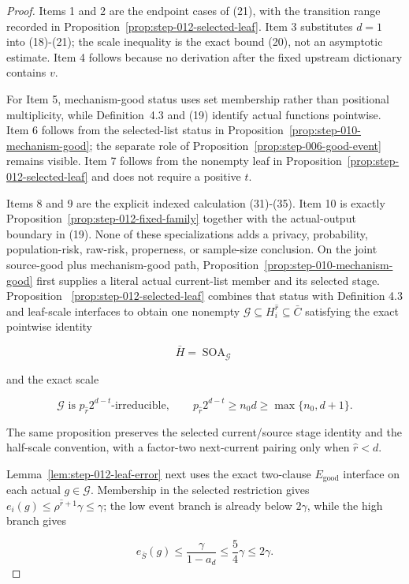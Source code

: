 \begin{proof}
Items 1 and 2 are the endpoint cases of (21), with the
transition range recorded in
Proposition~\ref{prop:step-012-selected-leaf}. Item 3 substitutes \(d=1\)
into (18)-(21); the scale inequality is the  exact bound (20), not
an asymptotic estimate. Item 4 follows because no derivation after the
fixed upstream dictionary contains \(v\).

For Item 5, mechanism-good status uses set membership rather than positional
multiplicity, while Definition~4.3 and (19) identify actual functions
pointwise. Item 6 follows from the selected-list status in
Proposition~\ref{prop:step-010-mechanism-good}; the separate role of
Proposition~\ref{prop:step-006-good-event} remains visible. Item 7 follows
from the nonempty leaf
in Proposition~\ref{prop:step-012-selected-leaf} and does not require a
positive \(t\).

Items 8 and 9 are the explicit indexed calculation (31)-(35). Item 10 is
exactly Proposition~\ref{prop:step-012-fixed-family} together with the
actual-output boundary in (19). None of these specializations adds a
privacy, probability, population-risk, raw-risk, properness, or sample-size
conclusion. 
On the joint source-good plus mechanism-good path, Proposition~\ref{prop:step-010-mechanism-good} first supplies a literal
actual current-list member and its selected stage. Proposition
~\ref{prop:step-012-selected-leaf} combines that status with 
Definition 4.3 and leaf-scale interfaces to obtain one nonempty
\(\mathcal G\subseteq H_i^{\widehat r}\subseteq\bar C\) satisfying the
exact pointwise identity

\[
 \bar H=\operatorname{SOA}_{\mathcal G}
\]

and the exact scale

 \[
 \mathcal G\text{ is }p_{\widehat r}2^{d-t}\text{-irreducible},
 \qquad
 p_{\widehat r}2^{d-t}\ge n_0d
 \ge\max\{n_0,d+1\}.
 \]

The same proposition preserves the selected current/source stage identity
and the half-scale convention, with a factor-two next-current pairing only
when \(\widehat r<d\).

Lemma~\ref{lem:step-012-leaf-error} next uses the exact two-clause
\(E_{\mathrm{good}}\) interface on each actual
\(g\in\mathcal G\). Membership in the selected restriction gives
\(e_i(g)\le\rho^{\widehat r+1}\gamma\le\gamma\); the low event branch is
already below \(2\gamma\), while the high branch gives

\[
 e_{\bar S}(g)
 \le\frac{\gamma}{1-a_d}
 \le\frac54\gamma
 \le2\gamma.
\]


\end{proof}
